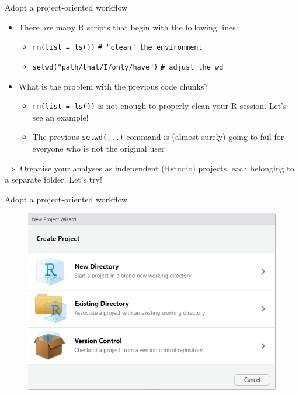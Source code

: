 \documentclass[
hyperref={bookmarks=false},
xcolor={dvipsnames,svgnames*,x11names*}, 
12pt
]{beamer}
\begin{document}
\begin{frame}{Adopt a project-oriented workflow}
\vspace{-0.5cm}
\begin{itemize}
\itemsep 2ex
\item There are many R scripts that begin with the following lines: 
\begin{itemize}
\item \texttt{rm(list = ls())} \texttt{\# "clean" the environment}
\item \texttt{setwd("path/that/I/only/have")} \texttt{\# adjust the wd}
\end{itemize}
\item What is the problem with the previous code chunks? 
\begin{itemize}
\item \texttt{rm(list = ls())} is not enough to properly clean your R session. Let's see an example! 
\item The previous \texttt{setwd(...)} command is (almost surely) going to fail for everyone who is not the original user 
\end{itemize} 
\vspace{0.5ex}
\end{itemize}
{\Huge$\Longrightarrow$} Organise your analyses as independent (Rstudio) projects, each belonging to a separate folder. Let's try! 
\end{frame}

\begin{frame}{Adopt a project-oriented workflow}
\begin{figure}
\centering
\includegraphics[width=0.9\linewidth]{figures/rstudio-proj.png}
\end{figure}
\end{frame}
\end{document}
